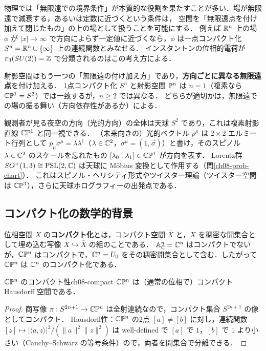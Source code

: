 物理では「無限遠での境界条件」が本質的な役割を果たすことが多い．場が無限遠で減衰する，あるいは定数に近づくという条件は，
空間を「無限遠点を付け加えて閉じたもの」の上の場として扱うことを可能にする．
例えば $\mathbb{R}^n$ 上の場 $\phi$ が $|x|\to\infty$ で方向によらず一定値に近づくなら，$\phi$ は一点コンパクト化 $S^n=\mathbb{R}^n\cup\{\infty\}$ 上の連続関数とみなせる．
インスタントンの位相的電荷が $\pi_3(SU(2))=\mathbb{Z}$ で分類されるのはこの考え方による．

射影空間はもう一つの「無限遠の付け加え方」であり，\textbf{方向ごとに異なる無限遠点}を付け加える．
1点コンパクト化 $S^n$ と射影空間 $\mathbb{P}^n$ は $n=1$（複素なら $\mathbb{C}\mathbb{P}^1=S^2$）では一致するが，$n\ge2$ では異なる．
どちらが適切かは，無限遠での場の振る舞い（方向依存性があるか）による．

\begin{physbox}
観測者が見る夜空の方向（光的方向）の全体は天球 $S^2$ であり，これは複素射影直線 $\mathbb{C}\mathbb{P}^1$ と同一視できる．
（未来向きの）光的ベクトル $p^\mu$ は $2\times2$ エルミート行列として $p_\mu\sigma^\mu=\lambda\lambda^\dagger$（$\lambda\in\mathbb{C}^2$，$\sigma^\mu=(1,\vec\sigma)$）と書け，そのスピノル $\lambda\in\mathbb{C}^2$ のスケールを忘れたもの $[\lambda_0:\lambda_1]\in\mathbb{C}\mathbb{P}^1$ が方向を表す．
Lorentz群 $SO^+(1,3)\cong\mathrm{PSL}(2,\mathbb{C})$ は天球に Möbius 変換として作用する（問\ref{ch08-prob-chart}）．
これはスピノル・ヘリシティ形式やツイスター理論（ツイスター空間は $\mathbb{C}\mathbb{P}^3$），さらに天球ホログラフィーの出発点である．
\end{physbox}

\subsection{コンパクト化の数学的背景}

位相空間 $X$ の\textbf{コンパクト化}とは，コンパクト空間 $\bar X$ と，$X$ を稠密な開集合として埋め込む写像 $X\hookrightarrow\bar X$ の組のことである．
$\mathbb{A}^n_{\mathbb{C}}=\mathbb{C}^n$ はコンパクトでないが，$\mathbb{C}\mathbb{P}^n$ はコンパクトで，$\mathbb{C}^n=U_0$ をその稠密開集合として含む．したがって $\mathbb{C}\mathbb{P}^n$ は $\mathbb{C}^n$ のコンパクト化である．

\begin{myprop}{$\mathbb{C}\mathbb{P}^n$ のコンパクト性}{ch08-compact}
$\mathbb{C}\mathbb{P}^n$ は（通常の位相で）コンパクト Hausdorff 空間である．
\end{myprop}

\begin{proof}
商写像 $\pi:S^{2n+1}\to\mathbb{C}\mathbb{P}^n$ は全射連続なので，コンパクト集合 $S^{2n+1}$ の像としてコンパクト．
Hausdorff性：$\mathbb{C}\mathbb{P}^n$ の2点 $[a]\neq[b]$ に対し，連続関数 $[z]\mapsto|\langle a,z\rangle|^2/(\|a\|^2\|z\|^2)$ は well-defined で $[a]$ で $1$，$[b]$ で $1$ より小さい（Cauchy–Schwarz の等号条件）ので，両者を開集合で分離できる．
\end{proof}

